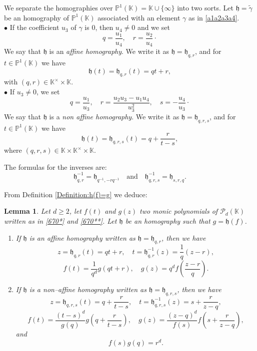 \documentclass[10pt]{article}
\newtheorem{lemma}[theorem]{Lemma}
\theoremstyle{definition}
\numberwithin{equation}{section}
\newcommand {\K}{{\mathbb{K}}}
\begin{document}
 We separate the homographies over $\mathbb P^1 (\K)=\K\cup \{\infty\}$ into two sorts. Let $\mathfrak h= \tilde \gamma$ be an homography of $\mathbb P^1(\K)$ associated with an element $\gamma$ as in \eqref{a1a2a3a4}.
 \\ 
 \noindent
 $\bullet$ If the coefficient $u_3$ of $\gamma$ is $0$, then $u_4\not=0$ and we set
\[
q=\frac {u_1}{u_4}, \quad r=\frac {u_2}{u_4}\cdotp
\]
We say that $\mathfrak h$ is an {\it affine homography}. We write it as $\mathfrak h= \mathfrak h_{q,r}$, and for
$t \in \mathbb P^1(\K)$ we have
\[
\mathfrak h (t) = \mathfrak h_{q,r} (t) = qt +r,
\]
with $(q,r) \in \K^\times \times \K$. 
 \\ 
$\bullet$ If $u_3\neq 0$, we set
\[
q=\frac {u_1}{u_3}, \quad r=\frac {u_2u_3-u_1u_4}{u_3^2}, \quad s=-\frac {u_4}{u_3}\cdotp
\]
We say that $\mathfrak h$ is a {\em non affine homography}. We write it as $\mathfrak h= \mathfrak h_{q,r,s}$, and for
$t \in \mathbb P^1(\K)$ we
have
\[
\mathfrak h (t) = \mathfrak h_{q,r,s} (t) = q+\frac r {t-s},
\]
where $(q,r,s) \in \K \times \K^\times \times \K$.

\noindent 
The formulas for the inverses are: 
 \begin{equation}\label{inverse}
 {\mathfrak h}_{q,r}^{-1}= {\mathfrak h}_{q^{-1},-rq^{-1}}
 \quad\text{and}
 \quad
 {\mathfrak h}_{q,r,s} ^{-1}= {\mathfrak h}_{s,r,q}.
 \end{equation}
     
 
 From Definition \ref{Definition:h(f)=g} we deduce:
 
 \begin{lemma}\label{998} Let $d \geqslant 2$, let $f(t)$ and $g(z)$ two monic polynomials of $\mathcal P_d(\K)$ written as in \eqref{670*} and \eqref{670**}. Let $\mathfrak h$ be an homography such that $g=\mathfrak h (f)$.
 
\begin{enumerate}
\item If $\mathfrak h$ is an affine homography written as $\mathfrak h = \mathfrak h_{q,r}$, then we have \[
z=\mathfrak h_{q,r} (t) =qt+r, \quad t= \mathfrak h_{q,r}^{-1} (z) = \frac 1q (z-r),
\]
\[%
f(t) = \frac 1{q^d} g(qt+r), \quad g(z) = q^d f \left( \frac {z-r}q \right).
\]%
\item If $\mathfrak h$ is a non--affine homography written as $\mathfrak h = \mathfrak h_{q,r,s}$, then we have 
\[
z=\mathfrak h_{q,r,s} (t) =q+ \frac r{t-s}, \quad t= \mathfrak h_{q,r,s}^{-1} (z) = s+\frac r{z-q},
\]
\begin{equation}\label{554}
f(t) = \frac{(t-s)^d}{g(q)} g\left( q+\frac r{t-s}\right), \quad g(z) = \frac{(z-q)^d}{f(s)}f \left( s +\frac r{z-q} \right), 
\end{equation}
and
\begin{equation}\label{555}
f(s)g(q) =r^d. 
\end{equation}
\end{enumerate}
\end{lemma}
 
\end{document}
